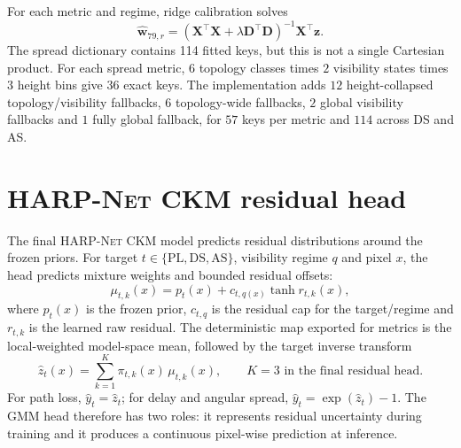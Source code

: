 For each metric and regime, ridge calibration solves
\begin{equation}
\hat{\mathbf{w}}_{79,r}
=
\left(\mathbf{X}^{\top}\mathbf{X}
+\lambda\mathbf{D}^{\top}\mathbf{D}\right)^{-1}
\mathbf{X}^{\top}\mathbf{z}.
\label{eq:ridge}
\end{equation}
The spread dictionary contains 114 fitted keys, but this is not a single
Cartesian product. For each spread metric, \(6\) topology classes times \(2\)
visibility states times \(3\) height bins give \(36\) exact keys. The
implementation adds \(12\) height-collapsed topology/visibility fallbacks,
\(6\) topology-wide fallbacks, \(2\) global visibility fallbacks and \(1\)
fully global fallback, for \(57\) keys per metric and \(114\) across DS and AS.

\section{\textsc{HARP-Net CKM} residual head}
\label{sec:try80_detail}

The final \textsc{HARP-Net CKM} model predicts residual distributions around
the frozen priors. For target
\(t\in\{\mathrm{PL},\mathrm{DS},\mathrm{AS}\}\), visibility regime \(q\) and
pixel \(x\), the head predicts mixture weights and bounded residual offsets:
\begin{equation}
\mu_{t,k}(x)
=
p_t(x)+c_{t,q(x)}\tanh r_{t,k}(x),
\label{eq:try80_mu}
\end{equation}
where \(p_t(x)\) is the frozen prior, \(c_{t,q}\) is the residual cap for the
target/regime and \(r_{t,k}\) is the learned raw residual. The deterministic
map exported for metrics is the local-weighted model-space mean, followed by
the target inverse transform
\begin{equation}
\hat z_t(x)
=
\sum_{k=1}^{K}\pi_{t,k}(x)\,\mu_{t,k}(x),
\qquad K=3 \text{ in the final residual head.}
\label{eq:try80_point}
\end{equation}
For path loss, \(\hat y_t=\hat z_t\); for delay and angular spread,
\(\hat y_t=\exp(\hat z_t)-1\).
The GMM head therefore has two roles: it represents residual uncertainty during
training and it produces a continuous pixel-wise prediction at inference.

